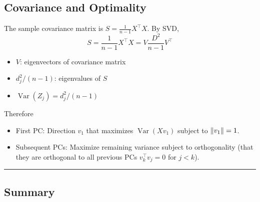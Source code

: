 \documentclass[
  letterpaper,
  DIV=11,
  numbers=noendperiod]{scrreprt}
\providecommand{\tightlist}{%
  \setlength{\itemsep}{0pt}\setlength{\parskip}{0pt}}
\newcommand{\Var}{\operatorname{Var}}
\theoremstyle{definition}
\theoremstyle{definition}
\theoremstyle{plain}
\theoremstyle{plain}
\theoremstyle{remark}
\begin{document}
\subsection{Covariance and Optimality}\label{covariance-and-optimality}

The sample covariance matrix is \(S = \frac{1}{n-1} X^\top X\). By SVD,
\[
S=\frac{1}{n-1} X^\top X = V \frac{D^2}{n-1} V^\top
\]

\begin{itemize}
\tightlist
\item
  \(V\): eigenvectors of covariance matrix\\
\item
  \(d_j^2/(n-1)\): eigenvalues of \(S\)
\item
  \(\Var(Z_j)=d_j^2/(n-1)\)
\end{itemize}

Therefore

\begin{itemize}
\tightlist
\item
  First PC: Direction \(v_1\) that maximizes \(\Var(Xv_1)\) subject to
  \(\norm{v_1}=1\).
\item
  Subsequent PCs: Maximize remaining variance subject to orthogonality
  (that they are orthogonal to all previous PCs \(v_k^\top v_j = 0\) for
  \(j < k\)).
\end{itemize}

\begin{center}\rule{0.5\linewidth}{0.5pt}\end{center}

\subsection{Summary}\label{summary-1}
\end{document}
